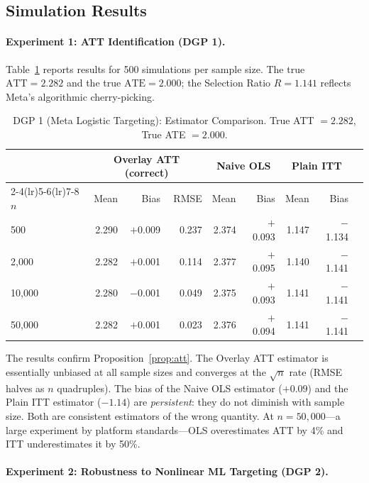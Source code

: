 \documentclass[12pt]{article}
\newcommand{\ATT}{\mathrm{ATT}}
\newcommand{\ATE}{\mathrm{ATE}}
\begin{document}
\subsection{Simulation Results}

\paragraph{Experiment 1: ATT Identification (DGP 1).}

Table~\ref{tab:dgp1} reports results for 500 simulations per sample size.
The true $\ATT = 2.282$ and the true $\ATE = 2.000$; the Selection Ratio
$R = 1.141$ reflects Meta's algorithmic cherry-picking.

\begin{table}[h!]
\centering
\caption{DGP 1 (Meta Logistic Targeting): Estimator Comparison.
True ATT $= 2.282$, True ATE $= 2.000$.}
\label{tab:dgp1}
\begin{tabular}{l rrrr rr rr}
\toprule
& \multicolumn{3}{c}{Overlay ATT (correct)} &
  \multicolumn{2}{c}{Naive OLS} &
  \multicolumn{2}{c}{Plain ITT} \\
\cmidrule(lr){2-4}\cmidrule(lr){5-6}\cmidrule(lr){7-8}
$n$ & Mean & Bias & RMSE & Mean & Bias & Mean & Bias \\
\midrule
500     & 2.290 & $+$0.009 & 0.237 & 2.374 & $+$0.093 & 1.147 & $-$1.134 \\
2{,}000  & 2.282 & $+$0.001 & 0.114 & 2.377 & $+$0.095 & 1.140 & $-$1.141 \\
10{,}000 & 2.280 & $-$0.001 & 0.049 & 2.375 & $+$0.093 & 1.141 & $-$1.141 \\
50{,}000 & 2.282 & $+$0.001 & 0.023 & 2.376 & $+$0.094 & 1.141 & $-$1.141 \\
\bottomrule
\end{tabular}
\end{table}

The results confirm Proposition~\ref{prop:att}. The Overlay ATT estimator
is essentially unbiased at all sample sizes and converges at the $\sqrt{n}$
rate (RMSE halves as $n$ quadruples). The bias of the Naive OLS estimator
($+0.09$) and the Plain ITT estimator ($-1.14$) are \emph{persistent}:
they do not diminish with sample size. Both are consistent estimators of
the wrong quantity. At $n = 50{,}000$---a large experiment by platform
standards---OLS overestimates ATT by 4\% and ITT underestimates it by
50\%.

\paragraph{Experiment 2: Robustness to Nonlinear ML Targeting (DGP 2).}
\end{document}
